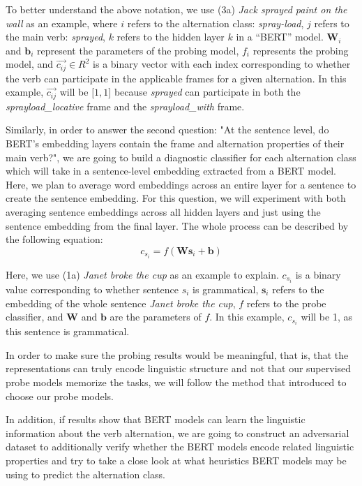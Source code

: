 \documentclass[11pt]{article}
\begin{document}
 To better understand the above notation, we use (3a) \textit{Jack sprayed paint on the wall} as an example, where $i$ refers to the alternation class: \textit{spray-load}, $j$ refers to the main verb:\textit{ sprayed}, $k$ refers to the hidden layer $k$ in a ``BERT'' model. $\textbf{W}_i$ and $\textbf{b}_i$ represent the parameters of the probing model, $f_{i}$ represents the probing model, and $\vec{c_{ij}} \in R^2$ is a binary vector with each index corresponding to whether the verb can participate in the applicable frames for a given alternation. In this example, $\vec{c_{ij}}$ will be $\lbrack 1,  1 \rbrack$ because \textit{sprayed} can participate in both the \textit{sprayload\_locative} frame and the \textit{sprayload\_with} frame.

Similarly, in order to answer the second question: "At the sentence level, do BERT's embedding layers contain the frame and alternation properties of their main verb?", we are going to build a diagnostic classifier for each alternation class which will take in a sentence-level embedding extracted from a BERT model. Here, we plan to average word embeddings across an entire layer for a sentence to create the sentence embedding. For this question, we will experiment with both averaging sentence embeddings across all hidden layers and just using the sentence embedding from the final layer. The whole process can be described by the following equation:
$$c_{{s}_{i}} = f(\textbf{W}\textbf{s}_{i} +\textbf{b})$$

Here, we use (1a) \textit{Janet broke the cup} as an example to explain. $c_{{s}_{i}}$ is a binary value corresponding to whether sentence $s_i$ is grammatical, $\textbf{s}_{i}$ refers to the embedding of the whole sentence \textit{Janet broke the cup}, $f$ refers to the probe classifier, and $\textbf{W}$ and $\textbf{b}$ are the parameters of $f$. In this example, $c_{{s}_{i}}$ will be 1, as this sentence is grammatical.

In order to make sure the probing results would be meaningful, that is, that the representations can truly encode linguistic structure and not that our supervised probe models memorize the tasks, we will follow the method that \citealt{hewitt2019designing} introduced to choose our probe models.

In addition, if results show that BERT models can learn the linguistic information about the verb alternation, we are going to construct an adversarial dataset to additionally verify whether the BERT models encode related linguistic properties and try to take a close look at what heuristics BERT models may be using to predict the alternation class.
\end{document}
